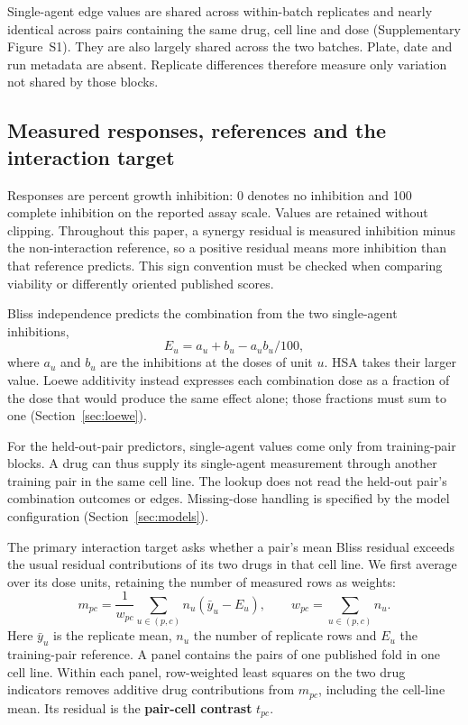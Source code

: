 \documentclass[11pt]{article}
\begin{document}
Single-agent edge values are shared across within-batch replicates and nearly identical across pairs containing the same drug, cell line and dose (Supplementary Figure~S1). They are also largely shared across the two batches. Plate, date and run metadata are absent. Replicate differences therefore measure only variation not shared by those blocks.

\subsection{Measured responses, references and the interaction target}\label{sec:targets}
Responses are percent growth inhibition: 0 denotes no inhibition and 100 complete inhibition on the reported assay scale. Values are retained without clipping. Throughout this paper, a synergy residual is measured inhibition minus the non-interaction reference, so a positive residual means more inhibition than that reference predicts. This sign convention must be checked when comparing viability or differently oriented published scores.

Bliss independence predicts the combination from the two single-agent inhibitions,
\begin{equation}\label{eq:bliss}
E_u=a_u+b_u-a_ub_u/100,
\end{equation}
where $a_u$ and $b_u$ are the inhibitions at the doses of unit $u$. HSA takes their larger value. Loewe additivity instead expresses each combination dose as a fraction of the dose that would produce the same effect alone; those fractions must sum to one (Section~\ref{sec:loewe}).

For the held-out-pair predictors, single-agent values come only from training-pair blocks. A drug can thus supply its single-agent measurement through another training pair in the same cell line. The lookup does not read the held-out pair's combination outcomes or edges. Missing-dose handling is specified by the model configuration (Section~\ref{sec:models}).

The primary interaction target asks whether a pair's mean Bliss residual exceeds the usual residual contributions of its two drugs in that cell line. We first average over its dose units, retaining the number of measured rows as weights:
\begin{equation}\label{eq:mpc}
m_{pc}=\frac{1}{w_{pc}}\sum_{u\in(p,c)} n_u(\bar y_u-E_u),\qquad w_{pc}=\sum_{u\in(p,c)}n_u .
\end{equation}
Here $\bar y_u$ is the replicate mean, $n_u$ the number of replicate rows and $E_u$ the training-pair reference. A panel contains the pairs of one published fold in one cell line. Within each panel, row-weighted least squares on the two drug indicators removes additive drug contributions from $m_{pc}$, including the cell-line mean. Its residual is the \textbf{pair-cell contrast} $t_{pc}$.
\end{document}
